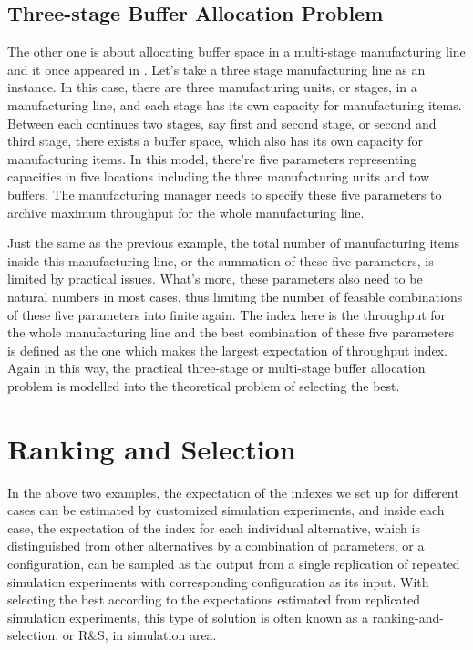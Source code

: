 \documentclass[12pt,a4paper]{report}
\begin{document}
\subsection{Three-stage Buffer Allocation Problem}

The other one is about allocating buffer space in a multi-stage manufacturing line and it once appeared in \cite{smoms93threestage}. Let's take a three stage manufacturing line as an instance. In this case, there are three manufacturing units, or stages, in a manufacturing line, and each stage has its own capacity for manufacturing items. Between each continues two stages, say first and second stage, or second and third stage, there exists a buffer space, which also has its own capacity for manufacturing items. In this model, there're five parameters representing capacities in five locations including the three manufacturing units and tow buffers. The manufacturing manager needs to specify these five parameters to archive maximum throughput for the whole manufacturing line.

Just the same as the previous example, the total number of manufacturing items inside this manufacturing line, or the summation of these five parameters, is limited by practical issues. What's more, these parameters also need to be natural numbers in most cases, thus limiting the number of feasible combinations of these five parameters into finite again. The index here is the throughput for the whole manufacturing line and the best combination of these five parameters is defined as the one which makes the largest expectation of throughput index. Again in this way, the practical three-stage or multi-stage buffer allocation problem is modelled into the theoretical problem of selecting the best.

\section{Ranking and Selection}

In the above two examples, the expectation of the indexes we set up for different cases can be estimated by customized simulation experiments, and inside each case, the expectation of the index for each individual alternative, which is distinguished from other alternatives by a combination of parameters, or a configuration, can be sampled as the output from a single replication of repeated simulation experiments with corresponding configuration as its input. With selecting the best according to the expectations estimated from replicated simulation experiments, this type of solution is often known as a ranking-and-selection, or R\&S, in simulation area.
\end{document}
